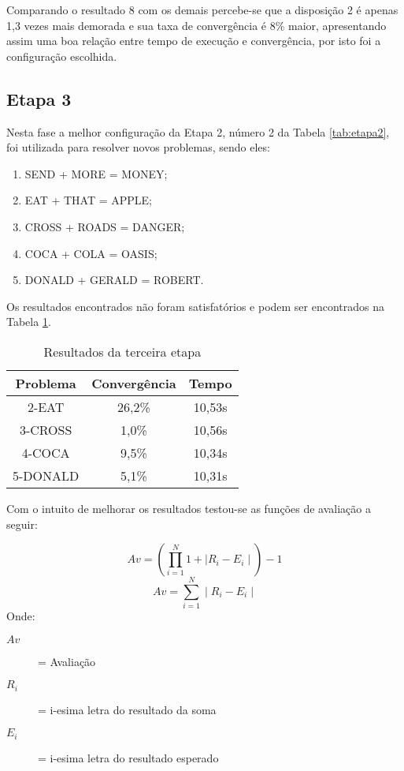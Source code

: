 \documentclass[a4paper, 12pt]{article}
\begin{document}
  Comparando o resultado 8 com os demais percebe-se que a disposição 2 é apenas
  1,3 vezes mais demorada e sua taxa de convergência é 8\% maior, apresentando assim
  uma boa relação entre tempo de execução e convergência, por isto foi a configuração
  escolhida.
  \subsection{Etapa 3}
  Nesta fase a melhor configuração da Etapa 2, número 2 da Tabela \ref{tab:etapa2},
  foi utilizada para resolver novos problemas, sendo eles:
  \begin{enumerate}
  \item SEND + MORE = MONEY;
  \item EAT + THAT = APPLE;
  \item CROSS + ROADS = DANGER;
  \item COCA + COLA = OASIS;
  \item DONALD + GERALD = ROBERT.
  \end{enumerate}

Os resultados encontrados não foram satisfatórios e podem ser encontrados na
Tabela \ref{tab:etapa3}.

  \begin{table}[h]
    \centering
    \begin{tabular}{|c|c|c|}
      \hline
      Problema & Convergência & Tempo \\
      \hline
      2-EAT & 26,2\% & 10,53s \\
      \hline
      3-CROSS & 1,0\% & 10,56s \\
      \hline
      4-COCA & 9,5\% & 10,34s \\
      \hline
      5-DONALD & 5,1\% & 10,31s \\
      \hline
    \end{tabular}
    \caption{Resultados da terceira etapa}
    \label{tab:etapa3}
  \end{table}

Com o intuito de melhorar os resultados testou-se as funções de avaliação a seguir:

  \begin{equation}
    Av = (\prod_{i=1}^{N} 1+\mid R_i - E_i\mid) -1
    \label{eq:avprod}
  \end{equation}
  \begin{equation}
    Av = \sum_{i=1}^{N} \mid R_i - E_i\mid
    \label{eq:avdifind}
  \end{equation}
Onde:
  \begin{description}
    \item[\(Av\)] = Avaliação
    \item[\(R_i\)] = i-esima letra do resultado da soma
    \item[\(E_i\)] = i-esima letra do resultado esperado
  \end{description}
\end{document}
